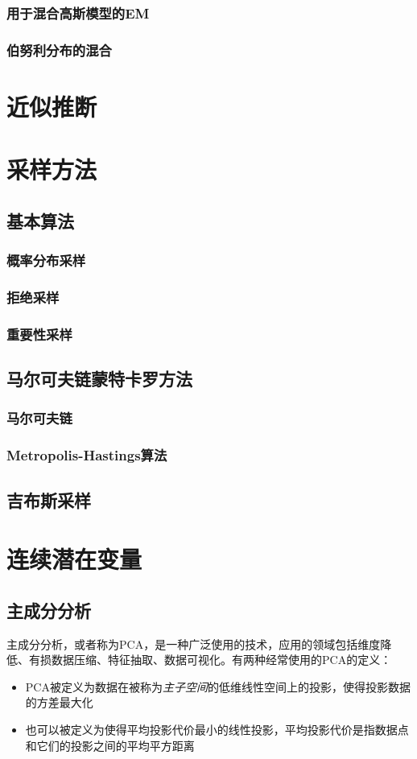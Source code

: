 \documentclass[11pt]{ctexbook}
\begin{document}
\subsection{用于混合高斯模型的EM}

\subsection{伯努利分布的混合}
\chapter{近似推断}

\chapter{采样方法}
\section{基本算法}
\subsection{概率分布采样}
\subsection{拒绝采样}
\subsection{重要性采样}
\section{马尔可夫链蒙特卡罗方法}
\subsection{马尔可夫链}
\subsection{Metropolis-Hastings算法}
\section{吉布斯采样}

\chapter{连续潜在变量}
\section{主成分分析}
主成分分析，或者称为PCA，是一种广泛使用的技术，应用的领域包括维度降低、有损数据压缩、特征抽取、数据可视化。有两种经常使用的PCA的定义：
\begin{itemize}
	\item PCA被定义为数据在被称为\emph{主子空间}的低维线性空间上的投影，使得投影数据的方差最大化
	\item 也可以被定义为使得平均投影代价最小的线性投影，平均投影代价是指数据点和它们的投影之间的平均平方距离
\end{itemize}
\end{document}
